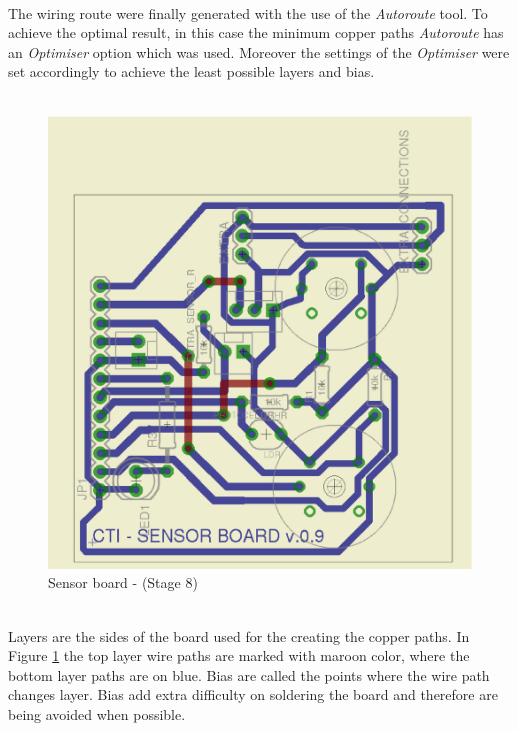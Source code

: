\documentclass[12pt,a4paper,draft]{report}
\begin{document}
\ \\
The wiring route were finally generated with the use of the \textit{Autoroute} tool. To achieve the optimal result, in this case the minimum copper paths \textit{Autoroute} has an \textit{Optimiser} option which was used. Moreover the settings of the \textit{Optimiser} were set accordingly to achieve the least possible layers and bias.\\
\ \\
\begin{figure}[H]
\centering
\includegraphics*[scale=0.25]{sens_brd_s8}
\caption{Sensor board -  (Stage 8)}
\label{Sensor-brd-s8}
\end{figure}
\ \\
Layers are the sides of the board used for the creating the copper paths. In Figure \ref{Sensor-brd-s8} the top layer wire paths are marked with maroon color, where the bottom layer paths are on blue. Bias are called the points where the wire path changes layer. Bias add extra difficulty on soldering the board and therefore are being avoided when possible.\\
\ \\
%
\end{document}
